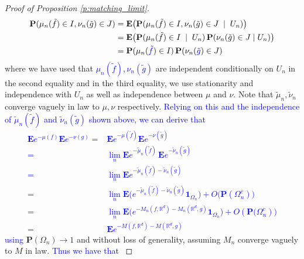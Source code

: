 \documentclass[12pt]{article}
\newcommand{\equlaw}{\stackrel{(d)}{=}}
\newcommand{\1}{\mathbf{1}}
\newcommand{\RL}[1]{\textcolor{blue}{#1}}
\newcommand{\dy}[1]{\textcolor{blue}{#1}}
\newcommand{\RL}[1]{#1}%
\newcommand{\dy}[1]{#1}%
\renewcommand{\footnote}[1]{}
\begin{document}
{{{{{\begin{proof}[Proof of Proposition \ref{p:matching_limit}]
{\begin{align*}
\mathbf{P}(\mu_n(\tilde f)\in I,\nu_n(\tilde g)\in J) &=  \mathbf{E}\bigl( \mathbf{P}(\mu_n ( \tilde f)\in I, \nu_n ( \tilde g)\in J\; \mid \;U_{n}) \bigr)\\
&=   {\mathbf{E}\bigl( \mathbf{P}(\mu_n (  \tilde f)\in I \; \mid \; U_n) \, \mathbf{P}( \nu_n ( \tilde g)\in J\;|\;U_{n}) \bigr)} \\
 & = \mathbf{P}(\mu_n (\dy{\tilde f})\in I) \, \mathbf{P}(\nu_n (\dy{\tilde g})\in J)
\end{align*}
 where we have used that \dy{$\mu_n ( \tilde f),\nu_n ( \tilde g)$} are independent conditionally on $U_n$ in the second equality and in the third equality, we use stationarity and independence with $U_n$ as well as independence between $ \mu $ and $ \nu.$}
%
{Note that $\tilde \mu_n,\tilde \nu_n$ converge vaguely in law to $\mu,\nu$ respectively.} \dy{Relying on this and the independence of $\tilde \mu _{n}( \tilde f)$ and $\tilde \nu_{n}(\tilde g)$ shown above, we can derive that 
%
\begin{align*}
\mathbf{E}e^{-\mu (f)} \mathbf{E}e^{-\nu (g)}  = & \mathbf{E}e^{-\mu (\tilde f)} \mathbf{E}e^{-\nu (\tilde g)}  \\
 = & \lim_{n}\mathbf{E}e^{-\tilde \mu_n (\tilde f)} \, \mathbf{E}e^{-\tilde \nu_n(\tilde g)}\\
  = & \lim_{n}\mathbf{E}e^{-\tilde \mu_n (\tilde f) -\tilde \nu_n(\tilde g)} \\
 = & \lim_{n}\mathbf{E}\Big(e^{-\tilde \mu_n (\tilde f) -\tilde \nu_n(\tilde g)}\1_{\Omega _{n}}\Big) + O\Big(\mathbf{P}(\Omega _{n}^{c})\Big) \\
 = & \lim_{n}\mathbf{E}\Big(e^{-M_{n}(f,\mathbb{R}^{d})- M_{n}(\mathbb{R}^{d},g)}\1_{\Omega _{n}}\Big) + O(\mathbf{P}\Big(\Omega _{n}^{c})\Big) \\
= & \mathbf{E}e^{-M(f,\mathbb{R}^d)- M(\mathbb{R}^d ,g)}
\end{align*}
%
using} $ \mathbf{P}(\Omega _{n})\to 1$ {and without loss of generality, assuming $M_n$ converge vaguely to $M$ in law.} \dy{Thus we have that 
}
\end{proof}}}}}}
\end{document}
